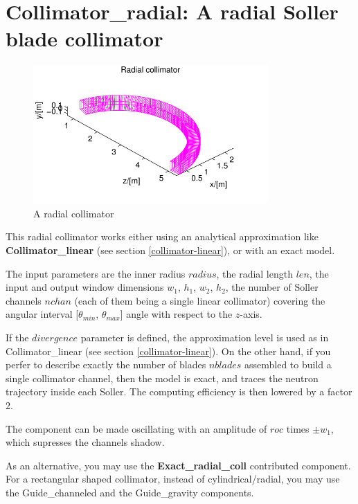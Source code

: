 \section{Collimator\_radial: A radial Soller blade collimator}


\begin{figure}
  \begin{center}
    \includegraphics[width=0.8\textwidth]{figures/radial}
  \end{center}
\caption{A radial collimator}
\label{f:coll-radial}
\end{figure}

This radial collimator works either using an analytical approximation
like {\bf Collimator\_linear} (see section \ref{collimator-linear}),
or with an exact model.

The input parameters are the inner radius $radius$, the radial length $len$,
the input and output window dimensions $w_1$, $h_1$, $w_2$, $h_2$,
the number of Soller channels $nchan$
(each of them being a single linear collimator) covering the angular interval
[$\theta_{min}$, $\theta_{max}$] angle with respect to the $z$-axis.

If the $divergence$ parameter is defined,
the approximation level is used as in {\rm Collimator\_linear}
(see section \ref{collimator-linear}).
On the other hand, if you perfer to describe exactly the number of blades
$nblades$ assembled to build a single collimator channel,
then the model is exact, and traces the neutron trajectory inside each Soller.
The computing efficiency is then lowered by a factor 2.

The component can be made oscillating with an amplitude of $roc$ times
$\pm w_1$, which supresses the channels shadow.

As an alternative, you may use the {\bf Exact\_radial\_coll} contributed component.
For a rectangular shaped collimator, instead of cylindrical/radial, you may use the Guide\_channeled and the Guide\_gravity components.

